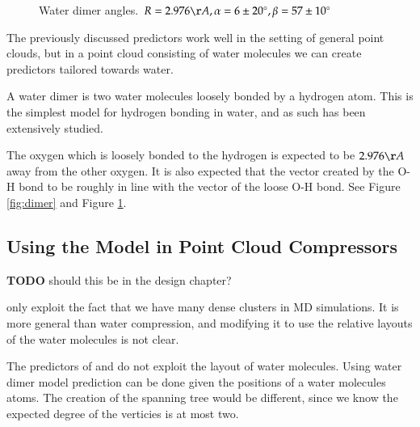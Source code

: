\documentclass{report}
\newcommand{\degree}{\ensuremath{^\circ}}
\newcommand{\todo}{\textbf{TODO} }
\begin{document}
\begin{figure}[h]
\centering
{}
\caption{Water dimer angles. $R = 2.976\AA, \alpha = 6 \pm 20\degree, \beta =
  57 \pm 10\degree$}
\label{fig:dimer-angle}
\end{figure}

The previously discussed predictors work well in the setting of general point
clouds, but in a point cloud consisting of water molecules we can create
predictors tailored towards water.

A water dimer is two water molecules loosely bonded by a hydrogen atom. This
is the simplest model for hydrogen bonding in water, and as such has been
extensively studied.

The oxygen which is loosely bonded to the hydrogen is expected to be
$2.976\AA$ away from the other oxygen. It is also expected that the vector
created by the O-H bond to be roughly in line with the vector of the loose O-H
bond. See Figure \ref{fig:dimer} and Figure \ref{fig:dimer-angle}.

\subsection{Using the Model in Point Cloud Compressors}

\todo should this be in the design chapter?

\citet{omeltchenko2000sls} only exploit the fact that we have many dense
clusters in MD simulations. It is more general than water compression, and
modifying it to use the relative layouts of the water molecules is not clear.

The predictors of \citet{merrycomp} and \citet{gumholdcomp} do not exploit the
layout of water molecules. Using water dimer model prediction can be done
given the positions of a water molecules atoms. The creation of the spanning
tree would be different, since we know the expected degree of the verticies is
at most two.
\end{document}

